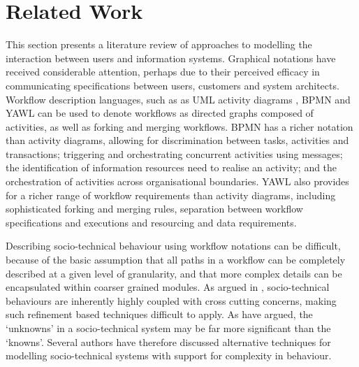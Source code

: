 \documentclass{llncs}
\begin{document}

\section{Related Work}
\label{sec:related}


This section presents a literature review of approaches to modelling the interaction between users and information
systems.  Graphical notations have received considerable attention, perhaps due to their perceived efficacy in
communicating specifications between users, customers and system architects.  Workflow description languages, such as as
UML activity diagrams \citep{omg07omguml}, BPMN \citep{omg2011omgbpmn} and YAWL \citep{hofstede2010yawl} can be used to
denote workflows as directed graphs composed of activities, as well as forking and merging workflows.  BPMN has a richer notation than activity diagrams, allowing for discrimination between tasks, activities and transactions;
triggering and orchestrating concurrent activities using messages; the identification of information resources need to
realise an activity; and the orchestration of activities across organisational boundaries. YAWL  also provides for a richer range of workflow requirements than
activity diagrams, including sophisticated forking and merging rules, separation between workflow specifications and
executions and resourcing and data requirements.

Describing socio-technical behaviour using workflow notations can be difficult, because of the basic assumption that all
paths in a workflow can be completely described at a given level of granularity, and that more complex details
can be encapsulated within coarser grained modules.  As argued in , socio-technical
behaviours are inherently highly coupled with cross cutting concerns, making such refinement based techniques difficult
to apply.  As \citet{israilidis13ignorance} have argued, the `unknowns' in a socio-technical system may be far more
significant than the `knowns'. Several authors have therefore discussed alternative techniques for modelling
socio-technical systems with support for complexity in behaviour.
\end{document}
